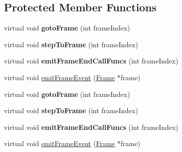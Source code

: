 \subsection*{Protected Member Functions}
\begin{DoxyCompactItemize}
\item 
\mbox{\label{classActionTimeline_a17a3c74d4f787a3f03d45cba884e57d1}} 
virtual void {\bfseries goto\+Frame} (int frame\+Index)
\item 
\mbox{\label{classActionTimeline_aa2b7d4e64f401f27f26fa831c4236ac4}} 
virtual void {\bfseries step\+To\+Frame} (int frame\+Index)
\item 
\mbox{\label{classActionTimeline_a1a45ea353f3874be9d0c963eae5c4bc1}} 
virtual void {\bfseries emit\+Frame\+End\+Call\+Funcs} (int frame\+Index)
\item 
virtual void \hyperlink{classActionTimeline_a27eb84aa71ea94ef78f85f495bf8b832}{emit\+Frame\+Event} (\hyperlink{classFrame}{Frame} $\ast$frame)
\item 
\mbox{\label{classActionTimeline_a46dab1204c145051ea84154d8f937a97}} 
virtual void {\bfseries goto\+Frame} (int frame\+Index)
\item 
\mbox{\label{classActionTimeline_a04c14133127123cc26410eb3067c6d4f}} 
virtual void {\bfseries step\+To\+Frame} (int frame\+Index)
\item 
\mbox{\label{classActionTimeline_aedf77be92f1b794a98d640be7d925d7c}} 
virtual void {\bfseries emit\+Frame\+End\+Call\+Funcs} (int frame\+Index)
\item 
virtual void \hyperlink{classActionTimeline_a85dbd264369208f079feb049d6fbf5d1}{emit\+Frame\+Event} (\hyperlink{classFrame}{Frame} $\ast$frame)
\end{DoxyCompactItemize}
